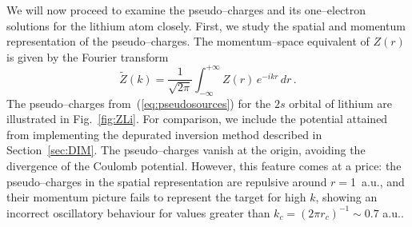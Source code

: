 \documentclass[10pt]{article}
\begin{document}
We will now proceed to examine the pseudo--charges and its 
one--electron solutions for the lithium atom closely. 
First, we study the spatial and momentum representation of the 
pseudo--charges. The momentum--space equivalent of $Z(r)$ is given 
by the Fourier transform
\begin{equation}
 \widetilde{Z}(k) = \frac{1}{\sqrt{2\pi}} \int_{-\infty}^{+\infty} 
 Z(r)\,e^{-ikr}\,dr\,.
\end{equation}
The pseudo--charges from~(\ref{eq:pseudosources}) for the $2s$ 
orbital of lithium are illustrated in Fig.~\ref{fig:ZLi}. 
For comparison, we include the potential attained from implementing 
the depurated inversion method described in Section~\ref{sec:DIM}.
The pseudo--charges vanish at the origin, avoiding the divergence 
of the Coulomb potential. However, this feature comes at a price: 
the pseudo--charges in the spatial representation are repulsive 
around \mbox{$r= $1 a.u.}, and their momentum picture fails to represent the 
target for high $k$, showing an incorrect oscillatory behaviour for 
values greater than $k_c=(2\pi r_c)^{-1}\sim0.7$ a.u..
\end{document}
